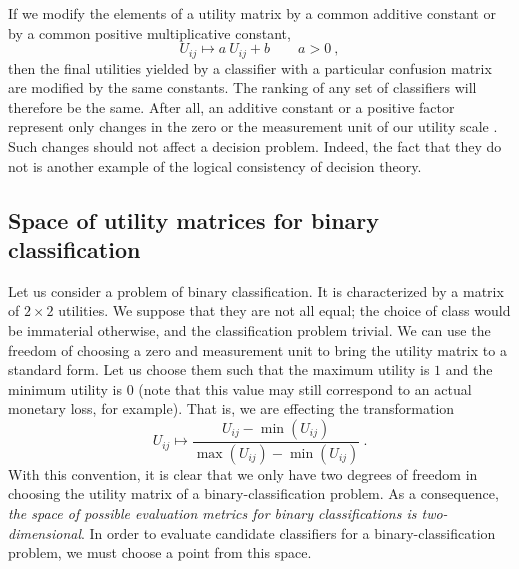 \documentclass[\ifafour a4paper,12pt,\else a5paper,10pt,\fi%
onecolumn,oneside,article,%
british%
]{memoir}
\theoremstyle{remark}
\theoremstyle{innote}
\renewcommand*{\|}[1][]{\nonscript\:#1\vert\nonscript\:\mathopen{}}
\newcommand*{\sect}{\S}%
\begin{document}
If we modify the elements of a utility matrix by a common additive constant or by a common positive multiplicative constant,
\begin{equation}
  \label{eq:modify_UM}
  U_{ij} \mapsto a\ U_{ij} + b  \qquad a > 0 \ ,
\end{equation}
then the final utilities yielded by a classifier with a particular confusion matrix are modified by the same constants. The ranking of any set of classifiers will therefore be the same. After all, an additive constant or a positive factor represent only changes in the zero or the measurement unit of our utility scale \autocites[cf.][\sect~15.2.2]{russelletal1995_r2022}. Such changes should not affect a decision problem. Indeed, the fact that they do not is another example of the logical consistency of decision theory.

\subsection{Space of utility matrices for binary classification}
\label{sec:dt_space_util}

Let us consider a problem of binary classification. It is characterized by a matrix of $2 \times 2$ utilities. We suppose that they are not all equal;  the choice of class would be immaterial otherwise, and the classification problem trivial. We can use the freedom of choosing a zero and measurement unit to bring the utility matrix to a standard form. Let us choose them such that the maximum utility is $1$ and the minimum utility is $0$ (note that this value may still correspond to an actual monetary loss, for example). That is, we are effecting the transformation
\begin{equation}
  \label{eq:normalize_utilities}
  U_{ij} \mapsto \frac{U_{ij} - \min(U_{ij})}{\max(U_{ij}) - \min(U_{ij})} \ .
\end{equation}
With this convention, it is clear that we only have two degrees of freedom in choosing the utility matrix of a binary-classification problem. As a consequence, \emph{the space of possible evaluation metrics for binary classifications is two-dimensional}. In order to evaluate candidate classifiers for a binary-classification problem, we must choose a point from this space.
\end{document}
